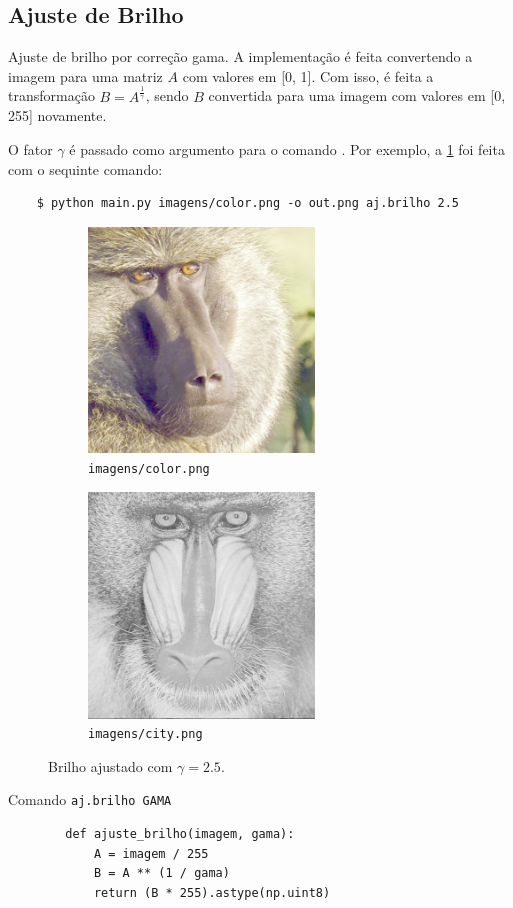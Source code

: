 \subsection{Ajuste de Brilho}

Ajuste de brilho por correção gama. A implementação é feita convertendo a imagem para uma matriz $A$ com valores em [0, 1]. Com isso, é feita a transformação $B = A^{\frac{1}{\gamma}}$,
sendo $B$ convertida para uma imagem com valores em [0, 255] novamente.

O fator $\gamma$ é passado como argumento para o comando . Por exemplo, a \cref{fig:ajbrilho} foi feita com o sequinte comando:

\begin{verbatim}
    $ python main.py imagens/color.png -o out.png aj.brilho 2.5
\end{verbatim}

\begin{figure}[H]
    \centering
    \begin{subfigure}{0.45\textwidth}
        \centering
        \includegraphics[width=6cm]{resultados/colorgama.png}
        \caption{\texttt{imagens/color.png}}
        \label{fig:ajbrilho}
    \end{subfigure}%
    \begin{subfigure}{0.45\textwidth}
        \centering
        \includegraphics[width=6cm]{resultados/baboongama.png}
        \caption{\texttt{imagens/city.png}}
    \end{subfigure}

    \caption{Brilho ajustado com $\gamma = 2.5$.}
\end{figure}

\begin{listing}[H]
    \caption{Comando \texttt{aj.brilho GAMA}}

    \begin{verbatim}
        def ajuste_brilho(imagem, gama):
            A = imagem / 255
            B = A ** (1 / gama)
            return (B * 255).astype(np.uint8)
    \end{verbatim}
\end{listing}
